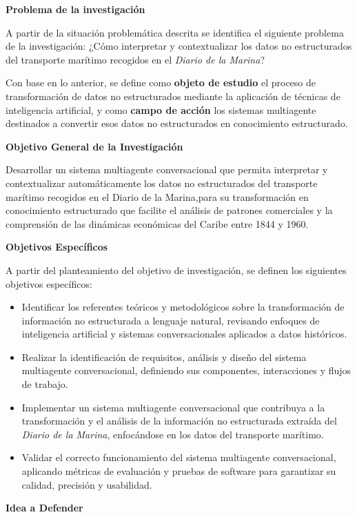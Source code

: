 \textbf{Problema de la investigación}

A partir de la situación problemática descrita se identifica el siguiente problema de la investigación: ¿Cómo interpretar y contextualizar los datos no estructurados del transporte marítimo recogidos en el \textit{Diario de la Marina}?

Con base en lo anterior, se define como \textbf{objeto de estudio} el proceso de transformación de datos no estructurados mediante la aplicación de técnicas de inteligencia artificial, y como \textbf{campo de acción} los sistemas multiagente destinados a convertir esos datos no estructurados en conocimiento estructurado.

\textbf{Objetivo General de la Investigación}

Desarrollar un sistema multiagente conversacional que permita interpretar y contextualizar automáticamente los datos no estructurados del transporte marítimo recogidos en el Diario de la Marina,para su transformación en conocimiento estructurado que facilite el análisis de patrones comerciales y la comprensión de las dinámicas económicas del Caribe entre 1844 y 1960.

\textbf{Objetivos Específicos}

A partir del planteamiento del objetivo de investigación, se definen los siguientes objetivos específicos:

\begin{itemize}
	\item Identificar los referentes teóricos y metodológicos sobre la transformación de información no estructurada a lenguaje natural, revisando enfoques de inteligencia artificial y sistemas conversacionales aplicados a datos históricos.
	\item Realizar la identificación de requisitos, análisis y diseño del sistema multiagente conversacional, definiendo sus componentes, interacciones y flujos de trabajo.
	\item Implementar un sistema multiagente conversacional que contribuya a la transformación y el análisis de la información no estructurada extraída del \textit{Diario de la Marina}, enfocándose en los datos del transporte marítimo.
	\item Validar el correcto funcionamiento del sistema multiagente conversacional, aplicando métricas de evaluación y pruebas de software para garantizar su calidad, precisión y usabilidad.
\end{itemize}

\textbf{Idea a Defender}

